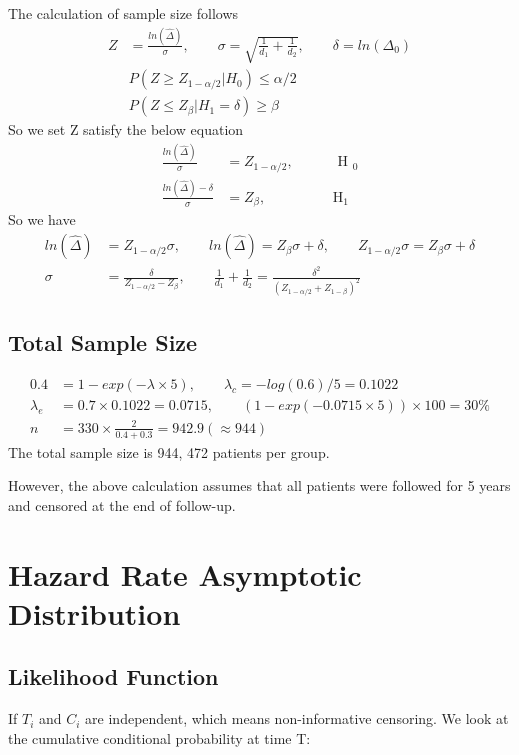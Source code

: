 \documentclass[11pt]{article} %
\begin{document}
The calculation of sample size follows
\begin{align*}
	Z &= \frac{ln(\hat{\Delta})}{\sigma}, \qquad \sigma = \sqrt{\frac{1}{d_1} + \frac{1}{d_2}}, \qquad \delta = ln(\Delta_0) \\
 &	P(Z \geq Z_{1-\alpha/2}| H_0)  \leq \alpha/2 \\
 &	P(Z \leq Z_{\beta}| H_1= \delta)  \geq \beta
\end{align*}
So we set Z satisfy the below equation
\begin{align*}
	\frac{ln(\hat{\Delta})}{\sigma} &= Z_{1-\alpha/2}, \qquad &\text{ H }_0\\
	\frac{ln(\hat{\Delta}) - \delta}{\sigma} &= Z_{\beta},  \qquad &\text{H}_1
\end{align*}
So we have
\begin{align*}
	ln(\hat{\Delta}) &= Z_{1-\alpha/2} \sigma, \qquad	ln(\hat{\Delta}) = Z_{\beta} {\sigma} + \delta ,\qquad	Z_{1-\alpha/2} \sigma = Z_{\beta} {\sigma} + \delta \\
	\sigma &= \frac{\delta}{Z_{1-\alpha/2} - Z_{\beta}}, \qquad 	\frac{1}{d_1} + \frac{1}{d_2} = \frac{\delta^2}{(Z_{1-\alpha/2} + Z_{1-\beta})^2}
\end{align*}

\subsection{Total Sample Size}

\begin{align*}
	0.4 &= 1- exp(-\lambda \times 5), \qquad \lambda_c = -log(0.6)/5 = 0.1022\\
	\lambda_e &= 0.7 \times 0.1022 = 0.0715, \qquad (1- exp(-0.0715 \times 5)) \times 100 = 30\%\\
	n &= 330 \times \frac{2}{0.4 + 0.3} = 942.9(\approx 944)
\end{align*}
The total sample size is 944, 472 patients per group.

However, the above calculation assumes that all patients were followed for 5 years and censored at the end of follow-up. 

\section{Hazard Rate Asymptotic Distribution}

\subsection{Likelihood Function}
If $T_i$ and $C_i$ are independent, which means non-informative censoring. We look at the cumulative conditional probability at time T:
\end{document}
